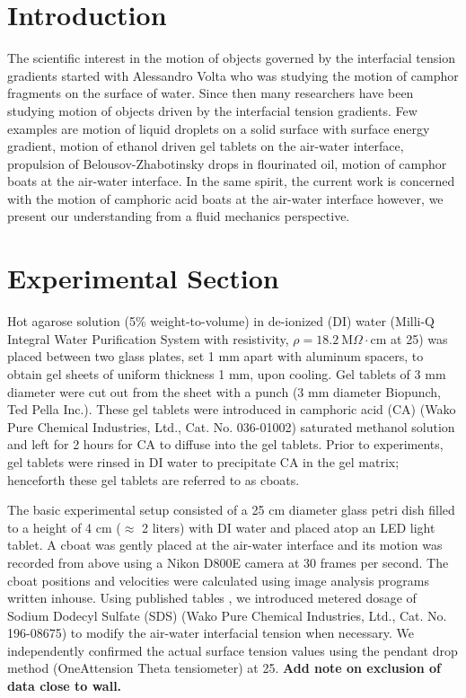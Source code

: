\documentclass[journal=langd5, manuscript=article, layout=onecolumn]{achemso}
\begin{document}
\section{Introduction}
The scientific interest in the motion of objects governed by the interfacial tension gradients started with Alessandro Volta who was studying the motion of camphor fragments on the surface of water. Since then many researchers have been studying motion of objects driven by the interfacial tension gradients. Few examples are motion of liquid droplets on a solid surface with surface energy gradient\cite{whitesides1992}, motion of ethanol driven gel tablets on the air-water interface\cite{velev2012}, propulsion of Belousov-Zhabotinsky drops in flourinated oil\cite{herminghaus2011}, motion of camphor boats at the air-water interface\cite{nakata2001}. In the same spirit, the current work is concerned with the motion of camphoric acid boats at the air-water interface however, we present our understanding from a fluid mechanics perspective.

\section{Experimental Section}
Hot agarose solution (5\% weight-to-volume) in de-ionized (DI) water (Milli-Q Integral Water Purification System with resistivity, $\rho=18.2\ \mathrm{M}\Omega\cdot\mathrm{cm}$ at 25\celsius) was placed between two glass plates, set 1 mm apart with aluminum spacers, to obtain gel sheets of uniform thickness 1 mm, upon cooling. Gel tablets of 3 mm diameter were cut out from the sheet with a punch (3 mm diameter Biopunch, Ted Pella Inc.). These gel tablets were introduced in camphoric acid (CA) (Wako Pure Chemical Industries, Ltd., Cat. No. 036-01002) saturated methanol solution and left for 2 hours for CA to diffuse into the gel tablets. Prior to experiments, gel tablets were rinsed in DI water to precipitate CA in the gel matrix; henceforth these gel tablets are referred to as cboats.

The basic experimental setup consisted of a 25 $\mathrm{cm}$ diameter glass petri dish filled to a height of 4 cm ($\approx$ 2 liters) with DI water and placed atop an LED light tablet. A cboat was gently placed at the air-water interface and its motion was recorded from above using a Nikon D800E camera at 30 frames per second. The cboat positions and velocities were calculated using image analysis programs written inhouse. Using published tables \cite{mysels1986}, we introduced metered dosage of Sodium Dodecyl Sulfate (SDS) (Wako Pure Chemical Industries, Ltd., Cat. No. 196-08675) to modify the air-water interfacial tension when necessary. We independently confirmed the actual surface tension values using the pendant drop method (OneAttension Theta tensiometer) at 25\celsius. {\bf Add note on exclusion of data close to wall.}
\end{document}
